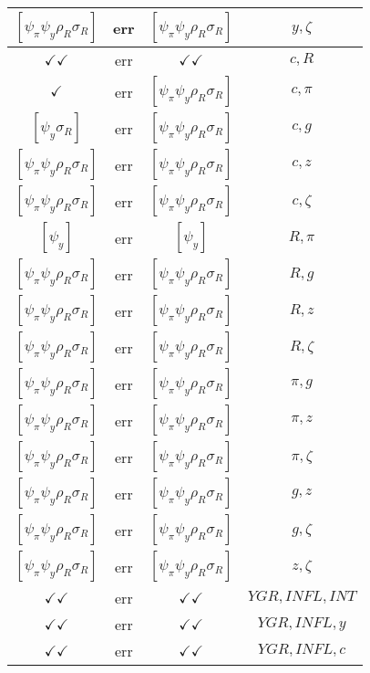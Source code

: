 \documentclass[a4paper,10pt]{article}
\begin{document}
\begin{longtable}{|c|c|c|c|}
\hline
$[\psi_\pi \psi_y \rho_R \sigma_R ]$ & err & $[\psi_\pi \psi_y \rho_R \sigma_R ]$ & ${y},{\zeta}$ \\
\hline
$\checkmark\checkmark$ & err & $\checkmark\checkmark$ & ${c},{R}$ \\
\hline
$\checkmark$ & err & $[\psi_\pi \psi_y \rho_R \sigma_R ]$ & ${c},{\pi}$ \\
\hline
$[\psi_y \sigma_R ]$ & err & $[\psi_\pi \psi_y \rho_R \sigma_R ]$ & ${c},{g}$ \\
\hline
$[\psi_\pi \psi_y \rho_R \sigma_R ]$ & err & $[\psi_\pi \psi_y \rho_R \sigma_R ]$ & ${c},{z}$ \\
\hline
$[\psi_\pi \psi_y \rho_R \sigma_R ]$ & err & $[\psi_\pi \psi_y \rho_R \sigma_R ]$ & ${c},{\zeta}$ \\
\hline
$[\psi_y ]$ & err & $[\psi_y ]$ & ${R},{\pi}$ \\
\hline
$[\psi_\pi \psi_y \rho_R \sigma_R ]$ & err & $[\psi_\pi \psi_y \rho_R \sigma_R ]$ & ${R},{g}$ \\
\hline
$[\psi_\pi \psi_y \rho_R \sigma_R ]$ & err & $[\psi_\pi \psi_y \rho_R \sigma_R ]$ & ${R},{z}$ \\
\hline
$[\psi_\pi \psi_y \rho_R \sigma_R ]$ & err & $[\psi_\pi \psi_y \rho_R \sigma_R ]$ & ${R},{\zeta}$ \\
\hline
$[\psi_\pi \psi_y \rho_R \sigma_R ]$ & err & $[\psi_\pi \psi_y \rho_R \sigma_R ]$ & ${\pi},{g}$ \\
\hline
$[\psi_\pi \psi_y \rho_R \sigma_R ]$ & err & $[\psi_\pi \psi_y \rho_R \sigma_R ]$ & ${\pi},{z}$ \\
\hline
$[\psi_\pi \psi_y \rho_R \sigma_R ]$ & err & $[\psi_\pi \psi_y \rho_R \sigma_R ]$ & ${\pi},{\zeta}$ \\
\hline
$[\psi_\pi \psi_y \rho_R \sigma_R ]$ & err & $[\psi_\pi \psi_y \rho_R \sigma_R ]$ & ${g},{z}$ \\
\hline
$[\psi_\pi \psi_y \rho_R \sigma_R ]$ & err & $[\psi_\pi \psi_y \rho_R \sigma_R ]$ & ${g},{\zeta}$ \\
\hline
$[\psi_\pi \psi_y \rho_R \sigma_R ]$ & err & $[\psi_\pi \psi_y \rho_R \sigma_R ]$ & ${z},{\zeta}$ \\
\hline
$\checkmark\checkmark$ & err & $\checkmark\checkmark$ & ${YGR},{INFL},{INT}$ \\
\hline
$\checkmark\checkmark$ & err & $\checkmark\checkmark$ & ${YGR},{INFL},{y}$ \\
\hline
$\checkmark\checkmark$ & err & $\checkmark\checkmark$ & ${YGR},{INFL},{c}$ \\
\hline

\end{longtable}
\end{document}
